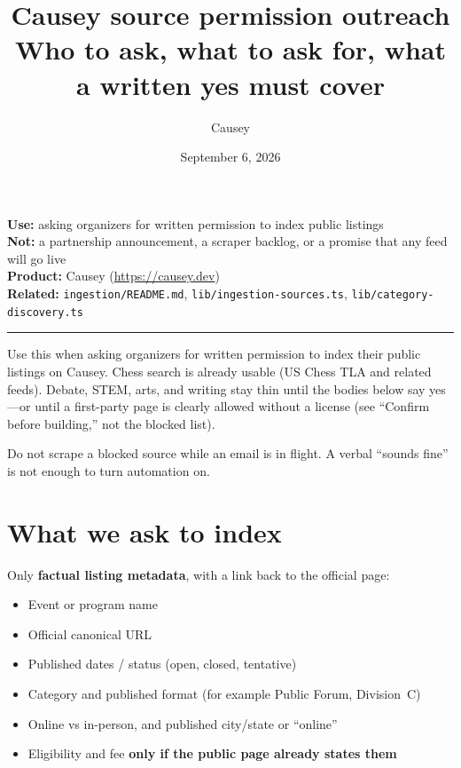 \documentclass[11pt]{article}
\title{Causey source permission outreach\\[0.3em]
\large Who to ask, what to ask for, what a written yes must cover}
\author{Causey}
\date{September 6, 2026}
\begin{document}
\maketitle
\vspace{-1.1em}

\noindent
\textbf{Use:} asking organizers for written permission to index public listings\\
\textbf{Not:} a partnership announcement, a scraper backlog, or a promise that any feed will go live\\
\textbf{Product:} Causey (\url{https://causey.dev})\\
\textbf{Related:} \texttt{ingestion/README.md}, \texttt{lib/ingestion-sources.ts}, \texttt{lib/category-discovery.ts}

\vspace{0.35em}
\hrule
\vspace{0.85em}

Use this when asking organizers for written permission to index their public listings on Causey. Chess search is already usable (US Chess TLA and related feeds). Debate, STEM, arts, and writing stay thin until the bodies below say yes---or until a first-party page is clearly allowed without a license (see ``Confirm before building,'' not the blocked list).

Do not scrape a blocked source while an email is in flight. A verbal ``sounds fine'' is not enough to turn automation on.

\section*{What we ask to index}

Only \textbf{factual listing metadata}, with a link back to the official page:

\begin{itemize}
  \item Event or program name
  \item Official canonical URL
  \item Published dates / status (open, closed, tentative)
  \item Category and published format (for example Public Forum, Division~C)
  \item Online vs in-person, and published city/state or ``online''
  \item Eligibility and fee \textbf{only if the public page already states them}
\end{itemize}
\end{document}
